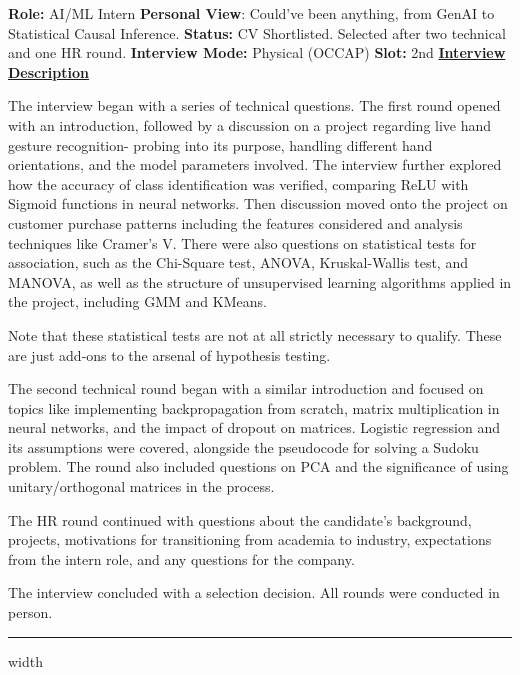\documentclass[12pt]{article}
\begin{document}
\textbf{Role:} AI/ML Intern
\newline
\textbf{Personal View}: Could've been anything, from GenAI to Statistical Causal Inference.
\newline
\textbf{Status:} CV Shortlisted. Selected after two technical and one HR round.
\newline
\textbf{Interview Mode:} Physical (OCCAP)
\newline
\textbf{Slot:} 2nd
\newline
\vspace{10pt}
\newline
\underline{\textbf{Interview Description}}
\newline

The interview began with a series of technical questions. The first round opened with an introduction, followed by a discussion on a project regarding live hand gesture recognition-  probing into its purpose, handling different hand orientations, and the model parameters involved. The interview further explored how the accuracy of class identification was verified, comparing ReLU with Sigmoid functions in neural networks. 
Then discussion moved onto the project on customer purchase patterns including the features considered and analysis techniques like Cramer's V. There were also questions on statistical tests for association, such as the Chi-Square test, ANOVA, Kruskal-Wallis test, and MANOVA, as well as the structure of unsupervised learning algorithms applied in the project, including GMM and KMeans.

Note that these statistical tests are not at all strictly necessary to qualify. These are just add-ons to the arsenal of hypothesis testing.

The second technical round began with a similar introduction and focused on topics like implementing backpropagation from scratch, matrix multiplication in neural networks, and the impact of dropout on matrices. Logistic regression and its assumptions were covered, alongside the pseudocode for solving a Sudoku problem. The round also included questions on PCA and the significance of using unitary/orthogonal matrices in the process.

The HR round continued with questions about the candidate's background, projects, motivations for transitioning from academia to industry, expectations from the intern role, and any questions for the company. 

The interview concluded with a selection decision. All rounds were conducted in person.

\vspace{10cm}


\hrule height 2pt width \linewidth
\begin{center}
\end{center}
\end{document}
